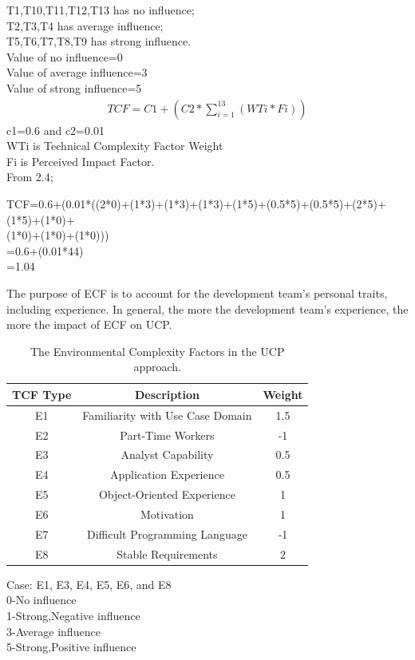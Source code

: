 \documentclass[12pt,letterpaper]{report}
\begin{document}
T1,T10,T11,T12,T13 has no influence;\\
T2,T3,T4 has average influence;\\
T5,T6,T7,T8,T9 has strong influence.\\

Value of no influence=0\\
Value of average influence=3\\
Value of strong influence=5\\
\begin{align} \label{Technical Complexity Factor}
    TCF=C1+(C2*\sum_{i=1}^{13} (WTi*Fi))
\end{align}
c1=0.6 and c2=0.01\\
WTi is Technical Complexity Factor Weight\\
Fi is Perceived Impact Factor.\\

From 2.4;
\begin{center}
    TCF=0.6+(0.01*((2*0)+(1*3)+(1*3)+(1*3)+(1*5)+(0.5*5)+(0.5*5)+(2*5)+(1*5)+(1*0)+\\(1*0)+(1*0)+(1*0)))\\
        =0.6+(0.01*44)\\
        =1.04
\end{center}

The purpose of ECF is to account for the development team’s personal traits, including experience. In general, the more the development team’s experience, the more the impact of ECF on UCP.

\begin{table}[h]
    \begin{center}
    \begin{tabular}{|c|c|c|}
    \hline
          TCF Type & Description & Weight \\
    \hline\hline
    E1 & Familiarity with Use Case Domain & 1.5  \\
    E2 & Part-Time Workers & -1 \\
    E3 & Analyst Capability & 0.5 \\
    E4 & Application Experience   & 0.5 \\
    E5 & Object-Oriented Experience & 1\\
    E6 & Motivation & 1 \\
    E7 & Difficult Programming Language & -1\\
    E8 & Stable Requirements & 2\\
    \hline
    \end{tabular}
    \end{center}
    \caption{The Environmental Complexity Factors in the UCP approach.\label{example_table}}
 \end{table}
Case: E1, E3, E4, E5, E6, and E8\\
0-No influence\\
1-Strong,Negative influence\\
3-Average influence\\
5-Strong,Positive influence\\
\end{document}
